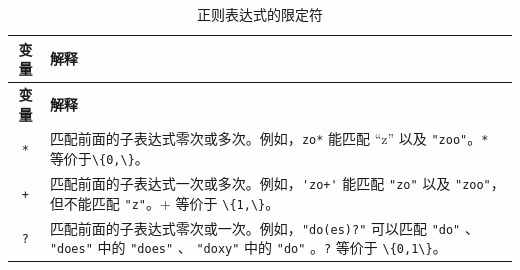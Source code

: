 \documentclass[doctor,openright,twoside]{sjtuthesis}
\newcommand{\passthrough}[1]{#1}
\theoremstyle{plain}
\theoremstyle{definition}
\theoremstyle{remark}
\theoremstyle{ocrenumbox}
\theoremstyle{plain}
\begin{document}
\begin{longtable}[]{@{}cl@{}}
\caption{正则表达式的限定符}\tabularnewline
\toprule
\begin{minipage}[b]{0.23\columnwidth}\centering
\textbf{变量}\strut
\end{minipage} & \begin{minipage}[b]{0.72\columnwidth}\raggedright
\textbf{解释}\strut
\end{minipage}\tabularnewline
\midrule
\endfirsthead
\toprule
\begin{minipage}[b]{0.23\columnwidth}\centering
\textbf{变量}\strut
\end{minipage} & \begin{minipage}[b]{0.72\columnwidth}\raggedright
\textbf{解释}\strut
\end{minipage}\tabularnewline
\midrule
\endhead
\begin{minipage}[t]{0.23\columnwidth}\centering
\passthrough{\lstinline!*!}\strut
\end{minipage} & \begin{minipage}[t]{0.72\columnwidth}\raggedright
匹配前面的子表达式零次或多次。例如，\passthrough{\lstinline!zo*!} 能匹配
``z'' 以及 \passthrough{\lstinline!"zoo"!}。\passthrough{\lstinline!*!}
等价于\passthrough{\lstinline!\{0,\}!}。\strut
\end{minipage}\tabularnewline
\begin{minipage}[t]{0.23\columnwidth}\centering
\passthrough{\lstinline!+!}\strut
\end{minipage} & \begin{minipage}[t]{0.72\columnwidth}\raggedright
匹配前面的子表达式一次或多次。例如，\passthrough{\lstinline!'zo+'!}
能匹配 \passthrough{\lstinline!"zo"!} 以及
\passthrough{\lstinline!"zoo"!}，但不能匹配
\passthrough{\lstinline!"z"!}。+ 等价于
\passthrough{\lstinline!\{1,\}!}。\strut
\end{minipage}\tabularnewline
\begin{minipage}[t]{0.23\columnwidth}\centering
\passthrough{\lstinline!?!}\strut
\end{minipage} & \begin{minipage}[t]{0.72\columnwidth}\raggedright
匹配前面的子表达式零次或一次。例如，\passthrough{\lstinline!"do(es)?"!}
可以匹配 \passthrough{\lstinline!"do"!} 、
\passthrough{\lstinline!"does"!} 中的 \passthrough{\lstinline!"does"!}
、 \passthrough{\lstinline!"doxy"!} 中的 \passthrough{\lstinline!"do"!}
。\passthrough{\lstinline!?!} 等价于
\passthrough{\lstinline!\{0,1\}!}。\strut
\end{minipage}\tabularnewline

\end{longtable}
\end{document}
